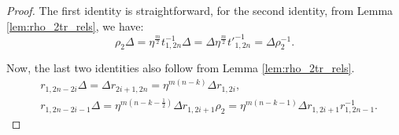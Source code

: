 \documentclass{amsart}
\begin{document}
\begin{proof}
The first identity is straightforward, for the second identity, from Lemma \ref{lem:rho_2tr_rels}, we have: 
\[
\rho_2\Delta=\eta^{\frac{m}{2}}t^{-1}_{1,2n}\Delta=\Delta \eta^{\frac{m}{2}}t'^{-1}_{1,2n}=\Delta\rho_2^{-1}.
\]

Now, the last two identities also follow from Lemma \ref{lem:rho_2tr_rels}. 
\begin{align*}
&r_{1,2n-2i}\Delta=\Delta r_{2i+1,2n}=\eta^{m(n-k)}\Delta r_{1,2i},\\
&r_{1,2n-2i-1}\Delta=\eta^{m(n-k-\frac{1}{2})}\Delta r_{1,2i+1}\rho_2=\eta^{m(n-k-1)}\Delta r_{1,2i+1}r^{-1}_{1,2n-1}.    
\end{align*}
  
\end{proof}

\end{document}
